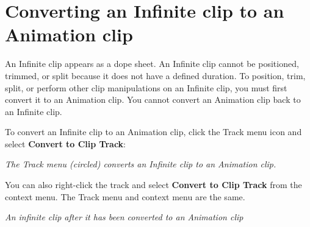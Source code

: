 \chapter{Converting an Infinite clip to an Animation clip}
\hypertarget{md__hey_tea_9_2_library_2_package_cache_2com_8unity_8timeline_0d1_87_85_2_documentation_0i_2wf__conv__infinite}{}\label{md__hey_tea_9_2_library_2_package_cache_2com_8unity_8timeline_0d1_87_85_2_documentation_0i_2wf__conv__infinite}
\label{md__hey_tea_9_2_library_2_package_cache_2com_8unity_8timeline_0d1_87_85_2_documentation_0i_2wf__conv__infinite_autotoc_md4770}%
%
 An Infinite clip appears as a dope sheet. An Infinite clip cannot be positioned, trimmed, or split because it does not have a defined duration. To position, trim, split, or perform other clip manipulations on an Infinite clip, you must first convert it to an Animation clip. You cannot convert an Animation clip back to an Infinite clip.

To convert an Infinite clip to an Animation clip, click the Track menu icon and select {\bfseries{Convert to Clip Track}}\+:



{\itshape The Track menu (circled) converts an Infinite clip to an Animation clip.}

You can also right-\/click the track and select {\bfseries{Convert to Clip Track}} from the context menu. The Track menu and context menu are the same.



{\itshape An infinite clip after it has been converted to an Animation clip} 